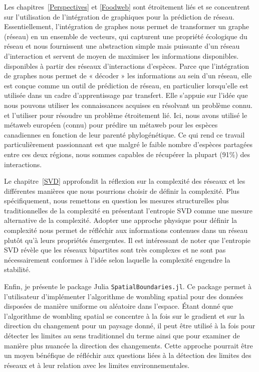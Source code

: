 \documentclass[12pt,twoside,phd]{dms}
\numberwithin{equation}{section}
\numberwithin{table}{chapter}
\numberwithin{figure}{chapter}
\begin{document}
Les chapitres~\ref{Perspectives} et \ref{Foodweb} sont étroitement liés et se concentrent sur l'utilisation de l'intégration de graphiques pour la prédiction de réseau. Essentiellement, l'intégration de graphes nous permet de transformer un graphe (réseau) en un ensemble de vecteurs, qui capturent une propriété écologique du réseau et nous fournissent une abstraction simple mais puissante d'un réseau d'interaction et servent de moyen de maximiser les informations disponibles. disponibles à partir des réseaux d’interactions d’espèces. Parce que l'intégration de graphes nous permet de « décoder » les informations au sein d'un réseau, elle est conçue comme un outil de prédiction de réseau, en particulier lorsqu'elle est utilisée dans un cadre d'apprentissage par transfert. Elle s'appuie sur l'idée que nous pouvons utiliser les connaissances acquises en résolvant un problème connu. et l'utiliser pour résoudre un problème étroitement lié. Ici, nous avons utilisé le métaweb européen (connu) pour prédire un métaweb pour les espèces canadiennes en fonction de leur parenté phylogénétique. Ce qui rend ce travail particulièrement passionnant est que malgré le faible nombre d’espèces partagées entre ces deux régions, nous sommes capables de récupérer la plupart (91\%) des interactions.

Le chapitre~\ref{SVD} approfondit la réflexion sur la complexité des réseaux et les différentes manières que nous pourrions choisir de définir la complexité. Plus spécifiquement, nous remettons en question les mesures structurelles plus traditionnelles de la complexité en présentant l'entropie SVD comme une mesure alternative de la complexité. Adopter une approche physique pour définir la complexité nous permet de réfléchir aux informations contenues dans un réseau plutôt qu'à leurs propriétés émergentes. Il est intéressant de noter que l’entropie SVD révèle que les réseaux bipartites sont très complexes et ne sont pas nécessairement conformes à l’idée selon laquelle la complexité engendre la stabilité.

Enfin, je présente le package Julia \texttt{SpatialBoundaries.jl}. Ce package permet à l'utilisateur d'implémenter l'algorithme de wombling spatial pour des données disposées de manière uniforme ou aléatoire dans l'espace. Étant donné que l’algorithme de wombling spatial se concentre à la fois sur le gradient et sur la direction du changement pour un paysage donné, il peut être utilisé à la fois pour détecter les limites au sens traditionnel du terme ainsi que pour examiner de manière plus nuancée la direction des changements. Cette approche pourrait être un moyen bénéfique de réfléchir aux questions liées à la détection des limites des réseaux et à leur relation avec les limites environnementales.
\end{document}
